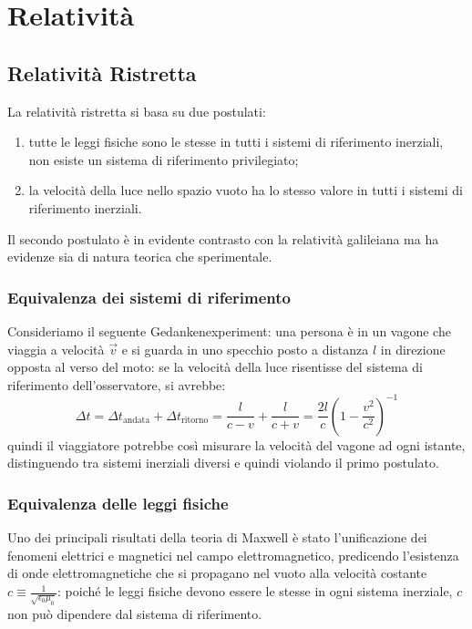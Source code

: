 \documentclass[]{article}
\begin{document}
\section{Relatività}

\subsection{Relatività Ristretta}
La relatività ristretta si basa su due postulati:
\begin{enumerate}
	\item tutte le leggi fisiche sono le stesse in tutti i sistemi di riferimento inerziali, non esiste un sistema di riferimento privilegiato;
	\item la velocità della luce nello spazio vuoto ha lo stesso valore in tutti i sistemi di riferimento inerziali.
\end{enumerate}
Il secondo postulato è in evidente contrasto con la relatività galileiana ma ha evidenze sia di natura teorica che sperimentale.

\subsubsection{Equivalenza dei sistemi di riferimento}

Consideriamo il seguente Gedankenexperiment: una persona è in un vagone che viaggia a velocità $ \vec{v} $ e si guarda in uno specchio posto a distanza $ l $ in direzione opposta al verso del moto: se la velocità della luce risentisse del sistema di riferimento dell'osservatore, si avrebbe:
\begin{equation}
	\Delta t = \Delta t_{\text{andata}} + \Delta t_{\text{ritorno}} = \frac{l}{c - v} + \frac{l}{c + v} = \frac{2l}{c} \left( 1 - \frac{v^2}{c^2}\right)^{-1}
	\label{eq:1}
\end{equation}
quindi il viaggiatore potrebbe così misurare la velocità del vagone ad ogni istante, distinguendo tra sistemi inerziali diversi e quindi violando il primo postulato.

\subsubsection{Equivalenza delle leggi fisiche}

Uno dei principali risultati della teoria di Maxwell è stato l'unificazione dei fenomeni elettrici e magnetici nel campo elettromagnetico, predicendo l'esistenza di onde elettromagnetiche che si propagano nel vuoto alla velocità costante $ c \equiv \frac{1}{\sqrt{\epsilon_0\mu_0}} $: poiché le leggi fisiche devono essere le stesse in ogni sistema inerziale, $ c $ non può dipendere dal sistema di riferimento.
\end{document}
